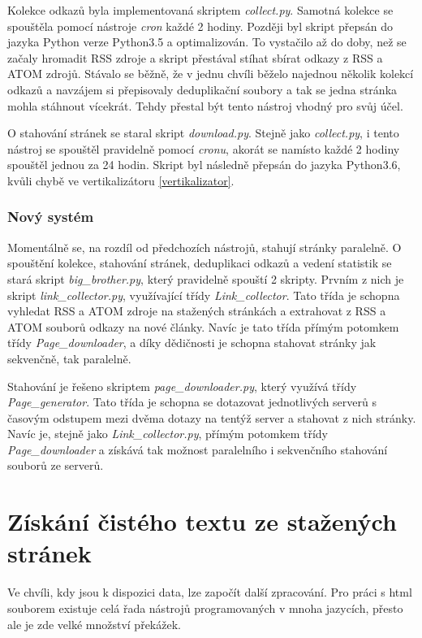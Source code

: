 Kolekce odkazů byla implementovaná skriptem \textit{collect.py}. Samotná kolekce se spouštěla pomocí nástroje \textit{cron} každé
2 hodiny. Později byl skript přepsán do jazyka Python verze Python3.5 a optimalizován. To vystačilo až do doby, než se začaly hromadit
RSS zdroje a skript přestával stíhat sbírat odkazy z RSS a ATOM zdrojů. Stávalo se běžně, že v jednu chvíli běželo najednou několik kolekcí odkazů
a navzájem si přepisovaly deduplikační soubory a tak se jedna stránka mohla stáhnout vícekrát. Tehdy přestal být tento nástroj vhodný
pro svůj účel.

O stahování stránek se staral skript \textit{download.py}. Stejně jako \textit{collect.py}, i tento nástroj se spouštěl pravidelně
pomocí \textit{cronu}, akorát se namísto každé 2 hodiny spouštěl jednou za 24 hodin. Skript byl následně přepsán do jazyka Python3.6, kvůli chybě
ve vertikalizátoru \ref{vertikalizator}.

\subsection{Nový systém}
Momentálně se, na rozdíl od předchozích nástrojů, stahují stránky paralelně. O spouštění kolekce, stahování stránek, deduplikaci odkazů a vedení statistik se
stará skript \textit{big\_brother.py}, který pravidelně spouští 2 skripty. Prvním z nich je skript \textit{link\_collector.py}, využívající třídy \textit{Link\_collector}.
Tato třída je schopna vyhledat RSS a ATOM zdroje na stažených stránkách a extrahovat z RSS a ATOM souborů odkazy na nové články.
Navíc je tato třída přímým potomkem třídy \textit{Page\_downloader}, a díky dědičnosti je schopna stahovat stránky jak sekvenčně, tak paralelně.

Stahování je řešeno skriptem \textit{page\_downloader.py}, který využívá třídy \textit{Page\_generator}. Tato třída je schopna se dotazovat jednotlivých serverů
s časovým odstupem mezi dvěma dotazy na tentýž server a stahovat z nich stránky. Navíc je, stejně jako \textit{Link\_collector.py}, přímým potomkem
třídy \textit{Page\_downloader} a získává tak možnost paralelního i sekvenčního stahování souborů ze serverů.

\chapter{Získání čistého textu ze stažených stránek}
Ve chvíli, kdy jsou k dispozici data, lze započít další zpracování. Pro práci s html souborem existuje celá řada nástrojů
programovaných v mnoha jazycích, přesto ale je zde velké množství překážek.


